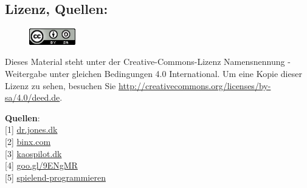 \subsection*{Lizenz, Quellen:}

\begin{figure}
\begin{center}
\includegraphics[width=2cm]{nomad/ccbysa88x31.png}
\end{center}
\end{figure}
Dieses Material steht unter der Creative-Commons-Lizenz Namensnennung - Weitergabe unter gleichen Bedingungen 4.0 International. Um eine Kopie dieser Lizenz zu sehen, besuchen Sie \url{http://creativecommons.org/licenses/by-sa/4.0/deed.de}.

\textbf{Quellen}: \\
{[}1{]} \href{http://dr.jones.dk}{dr.jones.dk} \\
{[}2{]} \href{http://binx.com/}{binx.com} \\
{[}3{]} \href{http://kaospilot.dk/}{kaospilot.dk} \\
{[}4{]} \href{http://goo.gl/9ENgMR}{goo.gl/9ENgMR} \\ %
{[}5{]} \href{http://spielend-programmieren.at}{spielend-programmieren}
